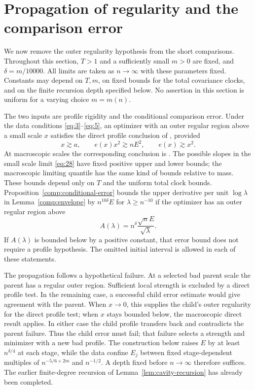 \section{Propagation of regularity and the comparison error}\label{sec:regularity}

We now remove the outer regularity hypothesis from the short comparisons.
Throughout this section, $T>1$ and a sufficiently small $m>0$ are fixed,
and $\delta=m/10000$.  All limits are taken as $n\to\infty$ with these
parameters fixed.  Constants may depend on $T,m$, on fixed bounds for the
total covariance clocks, and on the finite recursion depth specified below.
No assertion in this section is uniform for a varying choice $m=m(n)$.

The two inputs are profile rigidity and the conditional comparison error.
Under the data
conditions \eqref{eq:3}--\eqref{eq:5}, an optimizer with an outer regular
region above a small scale $x$ satisfies the direct profile conclusion
of , provided
\[
 x\gtrsim a,\qquad e(x)x^2\gtrsim nE^2,
 \qquad e(x)\gtrsim x^2.
\]
At macroscopic scales the corresponding conclusion is
.  The possible slopes in the small
scale limit \eqref{eq:28} have fixed positive upper and lower bounds;
the macroscopic limiting quantile has the same kind of bounds relative
to mass.  These bounds depend only on $T$ and the uniform total clock
bounds.  Proposition~\ref{comp:conditional-error} bounds the upper
derivative per unit $\log\lambda$ in Lemma~\ref{comp:envelope} by
$n^{10\delta}E$ for
$\lambda\ge n^{-10}$ if the optimizer has an outer regular region above
\[
 A(\lambda)=n^\delta\frac{\sqrt n E}{\sqrt\lambda}.
\]
If $A(\lambda)$ is bounded below by a positive constant, that error
bound does not require a profile hypothesis.  The omitted initial
interval is allowed in each of these statements.

The propagation follows a hypothetical failure. At a selected bad
parent scale the parent has a regular outer region. Sufficient local
strength is excluded by a direct profile test. In the remaining case,
a successful child error estimate would give agreement with the
parent. When $x\to0$, this supplies the child's outer regularity for
the direct profile test; when $x$ stays bounded below, the macroscopic
direct result applies. In either case the child profile transfers
back and contradicts the parent failure. Thus the child error must
fail; that failure selects a strength and minimizer with a new bad
profile. The construction below raises $E$ by at least $n^{\delta/4}$
at each stage, while the data confine $E_j$ between fixed
stage-dependent multiples of $n^{-5/6+2m}$ and $n^{-1/2}$. A depth
fixed before $n\to\infty$ therefore suffices. The earlier finite-degree
recursion of Lemma~\ref{lem:cavity-recursion} has already been completed.

